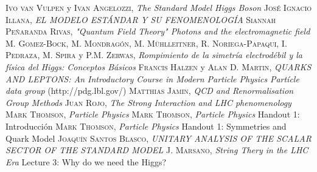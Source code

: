 \documentclass[11pt, a4paper]{article}
\begin{document}
\newpage
\begin{thebibliography}{99}
 \textsc{Ivo van Vulpen} y \textsc{Ivan Angelozzi},
\textit{The Standard Model Higgs Boson}
 \textsc{José Ignacio Illana},
\textit{EL MODELO ESTÁNDAR Y SU FENOMENOLOGÍA}
 \textsc{Siannah Peñaranda Rivas},
\textit{"Quantum Field Theory" Photons and the electromagnetic field}
 \textsc{M. Gomez-Bock}, \textsc{M. Mondragón}, \textsc{M. Mühlleitner}, \textsc{R. Noriega-Papaqui}, \textsc{I. Pedraza}, \textsc{M. Spira} y \textsc{P.M. Zerwas},
\textit{Rompimiento de la simetría electrodébil y la física del Higgs: Conceptos Básicos}
 \textsc{Francis Halzen} y \textsc{Alan D. Martin},
\textit{QUARKS AND LEPTONS: An Introductory Course in Modern Particle Physics}
 \textit{Partícle data group} (http://pdg.lbl.gov/)
 \textsc{Matthias Jamin},
\textit{QCD and Renormalisation Group Methods}
\textsc{Juan Rojo},
\textit{The Strong Interaction and LHC phenomenology}
 \textsc{Mark Thomson},
\textit{Particle Physics}
 \textsc{Mark Thomson},
\textit{Particle Physics} Handout 1: Introducción
 \textsc{Mark Thomson},
\textit{Particle Physics} Handout 1: Symmetries and Quark Model
 \textsc{Joaquín Santos Blasco},
\textit{UNITARY ANALYSIS OF THE SCALAR SECTOR OF THE STANDARD MODEL}
 \textsc{J. Marsano},
\textit{String Thery in the LHC Era} Lecture 3: Why do we need the Higgs? 

\end{thebibliography}
\end{document}
